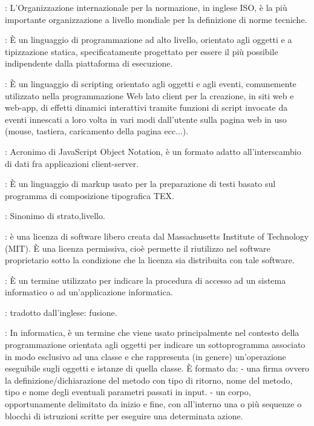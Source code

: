 {		: L'Organizzazione internazionale per la normazione, in inglese ISO, è la più importante organizzazione a livello mondiale per la definizione di norme tecniche.

		: È un linguaggio di programmazione ad alto livello, orientato agli oggetti e a tipizzazione statica, specificatamente progettato per essere il più possibile indipendente dalla piattaforma di esecuzione.

		: È un linguaggio di scripting orientato agli oggetti e agli eventi, comunemente utilizzato nella programmazione Web lato client per la creazione, in siti web e web-app, di effetti dinamici interattivi tramite funzioni di script invocate da eventi innescati a loro volta in vari modi dall'utente sulla pagina web in uso (mouse, tastiera, caricamento della pagina ecc...).

		: Acronimo di JavaScript Object Notation, è un formato adatto all'interscambio di dati fra applicazioni client-server.

		\glossaryElement{\LaTeX\ }: È un linguaggio di markup usato per la preparazione di testi basato sul programma di composizione tipografica TEX.

		: Sinonimo di strato,livello.

		: è una licenza di software libero creata dal Massachusetts Institute of Technology (MIT). È una licenza permissiva, cioè permette il riutilizzo nel software proprietario sotto la condizione che la licenza sia distribuita con tale software.

		: È un termine utilizzato per indicare la procedura di accesso ad un sistema informatico o ad un'applicazione informatica.

		: tradotto dall'inglese: fusione.

		: In informatica, è un termine che viene usato principalmente nel contesto della programmazione orientata agli oggetti per indicare un sottoprogramma associato in modo esclusivo ad una classe e che rappresenta (in genere) un'operazione eseguibile sugli oggetti e istanze di quella classe. È formato da:
- una firma ovvero la definizione/dichiarazione del metodo con tipo di ritorno, nome del metodo, tipo e nome degli eventuali parametri passati in input.
- un corpo, opportunamente delimitato da inizio e fine, con all'interno una o più sequenze o blocchi di istruzioni scritte per eseguire una determinata azione.

}
